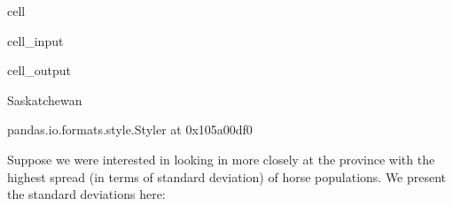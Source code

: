 \documentclass[letterpaper,10pt,english]{jupyterBook}
\begin{document}
\begin{sphinxuseclass}{cell}\begin{sphinxVerbatimInput}

\begin{sphinxuseclass}{cell_input}
\begin{sphinxVerbatim}[commandchars=\\\{\}]
  

  \PYG{p}{[}\PYG{p}{]}\PYG{p}{[}\PYG{p}{]}
 

  
 
\end{sphinxVerbatim}

\end{sphinxuseclass}\end{sphinxVerbatimInput}
\begin{sphinxVerbatimOutput}

\begin{sphinxuseclass}{cell_output}
\begin{sphinxVerbatim}[commandchars=\\\{\}]
\PYGZsq{}Saskatchewan\PYGZsq{}
\end{sphinxVerbatim}

\begin{sphinxVerbatim}[commandchars=\\\{\}]
\PYGZlt{}pandas.io.formats.style.Styler at 0x105a00df0\PYGZgt{}
\end{sphinxVerbatim}

\end{sphinxuseclass}\end{sphinxVerbatimOutput}

\end{sphinxuseclass}
\sphinxAtStartPar
Suppose we were interested in looking in more closely at the
province with the highest spread (in terms of standard deviation)
of horse populations. We present the standard deviations here:
\end{document}

